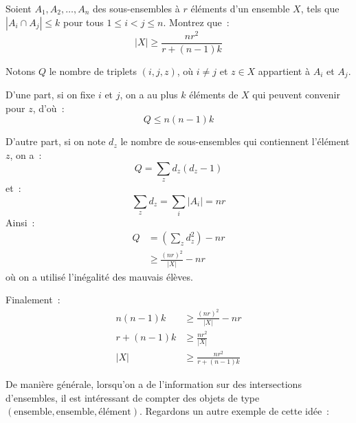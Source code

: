 \begin{exo}
	Soient $A_1, A_2, \dots, A_n$ des sous-ensembles à $r$ éléments d'un ensemble $X$, tels que $|A_i \cap A_j| \leq k$ pour tous $1 \leq i < j \leq n$.
	Montrez que~:
	$$|X| \geq \frac{nr^2}{r + (n - 1)k}$$
\end{exo}
\begin{sol}
	Notons $Q$ le nombre de triplets $(i, j, z)$, où $i \neq j$ et $z \in X$ appartient à $A_i$ et $A_j$.
	
	D'une part, si on fixe $i$ et $j$, on a au plus $k$ éléments de $X$ qui peuvent convenir pour $z$, d'où~:
	$$Q \leq n(n - 1) k$$
	
	D'autre part, si on note $d_z$ le nombre de sous-ensembles qui contiennent l'élément $z$, on a~:
	$$Q = \sum_z d_z(d_z - 1)$$
	et~:
	$$\sum_z d_z = \sum_i |A_i| = nr$$
	Ainsi~:
	\begin{align*}
	Q &= \left (\sum_z d_z^2 \right ) - nr \\
	&\geq \frac{(nr)^2}{|X|} - nr
	\end{align*}
	où on a utilisé l'inégalité des mauvais élèves.
	
	Finalement~:
	\begin{align*}
	n(n - 1) k &\geq \frac{(nr)^2}{|X|} - nr \\
	r + (n - 1) k &\geq \frac{nr^2}{|X|} \\
	|X| &\geq \frac{nr^2}{r + (n - 1)k}
	\end{align*}
\end{sol}

De manière générale, lorsqu'on a de l'information sur des intersections d'ensembles, il est intéressant de compter des objets de type $(\mbox{ensemble}, \mbox{ensemble}, \mbox{élément})$.
Regardons un autre exemple de cette idée~:

